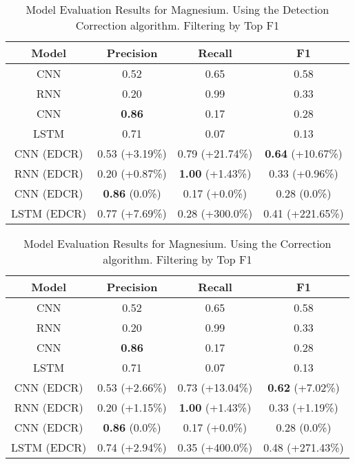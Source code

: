 \begin{table}
\centering
\begin{tabular}{|c|c|c|c|}
\hline
Model & Precision & Recall & F1\\
\hline
CNN  & 0.52 & 0.65 & 0.58\\
RNN  & 0.20 & 0.99 & 0.33\\
CNN  & \textbf{0.86} & 0.17 & 0.28\\
LSTM  & 0.71 & 0.07 & 0.13\\

\hline
CNN  (EDCR) & 0.53 (+3.19\%) & 0.79 (+21.74\%) & \textbf{0.64} (+10.67\%)\\
RNN  (EDCR) & 0.20 (+0.87\%) & \textbf{1.00} (+1.43\%) & 0.33 (+0.96\%)\\
CNN  (EDCR) & \textbf{0.86} (0.0\%) & 0.17 (+0.0\%) & 0.28 (0.0\%)\\
LSTM  (EDCR) & 0.77 (+7.69\%) & 0.28 (+300.0\%) & 0.41 (+221.65\%)\\

\hline
\end{tabular}
\caption{Model Evaluation Results for Magnesium. Using the Detection Correction algorithm. Filtering by Top F1}
\end{table}
\begin{table}
\centering
\begin{tabular}{|c|c|c|c|}
\hline
Model & Precision & Recall & F1\\
\hline
CNN  & 0.52 & 0.65 & 0.58\\
RNN  & 0.20 & 0.99 & 0.33\\
CNN  & \textbf{0.86} & 0.17 & 0.28\\
LSTM  & 0.71 & 0.07 & 0.13\\

\hline
CNN  (EDCR) & 0.53 (+2.66\%) & 0.73 (+13.04\%) & \textbf{0.62} (+7.02\%)\\
RNN  (EDCR) & 0.20 (+1.15\%) & \textbf{1.00} (+1.43\%) & 0.33 (+1.19\%)\\
CNN  (EDCR) & \textbf{0.86} (0.0\%) & 0.17 (+0.0\%) & 0.28 (0.0\%)\\
LSTM  (EDCR) & 0.74 (+2.94\%) & 0.35 (+400.0\%) & 0.48 (+271.43\%)\\

\hline
\end{tabular}
\caption{Model Evaluation Results for Magnesium. Using the Correction algorithm. Filtering by Top F1}
\end{table}
